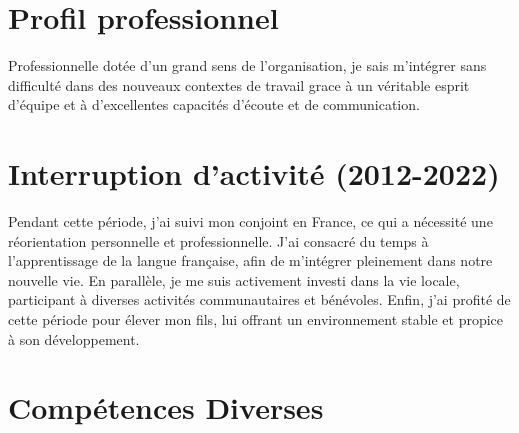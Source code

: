 \documentclass[11pt,a4paper,sans]{moderncv}
\title{}
\begin{document}
\makecvtitle

\section{Profil professionnel}

Professionnelle dotée d’un grand sens de l’organisation, je sais m’intégrer sans difficulté dans des nouveaux
contextes de travail grace à un véritable esprit d’équipe et à d’excellentes capacités d’écoute et de
communication.

\section{Interruption d'activité (2012-2022)}

Pendant cette période, j'ai suivi mon conjoint en France, ce qui a nécessité une réorientation personnelle et professionnelle. 
J'ai consacré du temps à l'apprentissage de la langue française, afin de m'intégrer pleinement dans notre nouvelle vie. 
En parallèle, je me suis activement investi dans la vie locale, participant à diverses activités communautaires et bénévoles. 
Enfin, j'ai profité de cette période pour élever mon fils, lui offrant un environnement stable et propice à son développement.


\section{Compétences Diverses}
\end{document}
